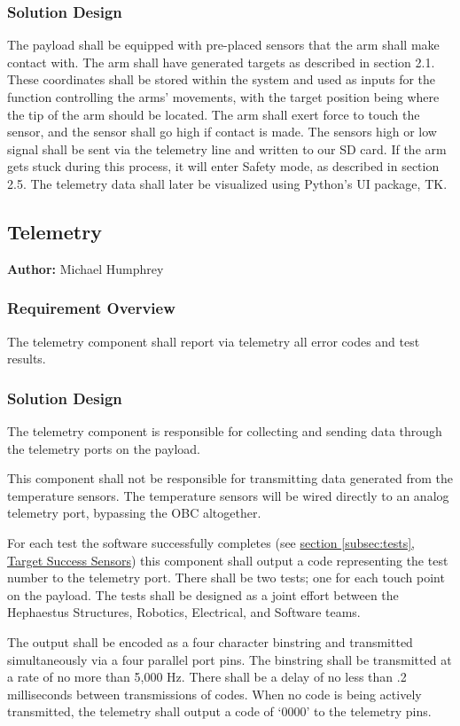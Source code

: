 \documentclass[letterpaper,10pt]{article}
\begin{document}
\subsubsection{Solution Design}
The payload shall be equipped with pre-placed sensors that the arm shall make contact with. The arm shall have generated targets
as described in section 2.1. These coordinates shall be stored within the system and used as inputs for the function controlling
the arms' movements, with the target position being where the tip of the arm should be located. The arm shall exert force to touch
the sensor, and the sensor shall go high if contact is made. The sensors high or low signal shall be sent via the telemetry
line and written to our SD card. If the arm gets stuck during this process, it will enter Safety mode, as described in section 2.5. The telemetry data shall
later be visualized using Python's UI package, TK. 

\subsection{Telemetry}
\textbf{Author:} Michael Humphrey
\subsubsection{Requirement Overview}
The telemetry component shall report via telemetry all error codes and test results.

\subsubsection{Solution Design}
The telemetry component is responsible for collecting and sending data through the
telemetry ports on the \gls{payload}.

This component shall not be responsible for transmitting data generated from the
temperature sensors.
The temperature sensors will be wired directly to an analog telemetry port,
bypassing the \gls{OBC} altogether.

For each test the software successfully completes (see \hyperref[subsec:tests]{section 
\ref*{subsec:tests},  Target Success Sensors}) this component shall output a code
representing the test number to the telemetry port.
There shall be two tests; one for each touch point on the \gls{payload}.
The tests shall be designed as a joint effort between the Hephaestus Structures,
Robotics, Electrical, and Software teams.

The output shall be encoded as a four character \gls{binstring} and transmitted
simultaneously via a four parallel port pins.
The \gls{binstring} shall be transmitted at a rate of no more than 5,000 Hz.
There shall be a delay of no less than .2 milliseconds between transmissions
of codes.
When no code is being actively transmitted, the telemetry shall output a code
of `0000' to the telemetry pins.
\end{document}
